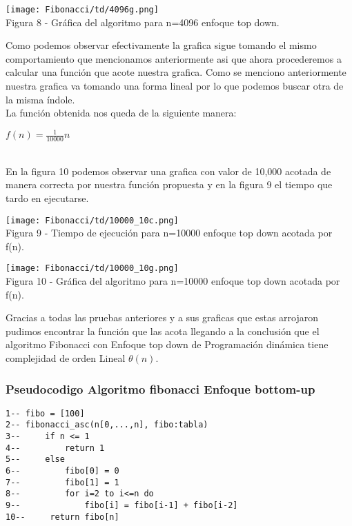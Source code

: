 \documentclass[12pt,twoside]{article}
\begin{document}
\begin{center}
    \texttt{[image: Fibonacci/td/4096g.png]}\\
    Figura 8 - Gráfica del algoritmo para n=4096 enfoque top down.
\end{center}
\newline
Como podemos observar efectivamente la grafica sigue tomando el mismo comportamiento que mencionamos anteriormente asi que ahora procederemos a calcular una función que acote nuestra grafica. Como se menciono anteriormente nuestra grafica va tomando una forma lineal por lo que podemos buscar otra de la misma índole. \\
La funci\'on obtenida nos queda de la siguiente manera:
\begin{center}
    $f(n) = \frac{1}{10000}n$
\end{center}\\
En la figura 10 podemos observar una grafica con valor de 10,000 acotada de manera correcta por nuestra función propuesta y en la figura 9 el tiempo que tardo en ejecutarse.
\begin{center}
    \texttt{[image: Fibonacci/td/10000\_10c.png]}\\
    Figura 9 - Tiempo de ejecución para n=10000 enfoque top down acotada por f(n).
\end{center}

\begin{center}
    \texttt{[image: Fibonacci/td/10000\_10g.png]}\\
    Figura 10 - Gráfica del algoritmo para n=10000 enfoque top down acotada por f(n).
\end{center}
\newline
Gracias a todas las pruebas anteriores y a sus graficas que estas arrojaron pudimos encontrar la función que las acota llegando a la conclusión que el algoritmo  Fibonacci con Enfoque top down de Programación dinámica  tiene complejidad de orden Lineal $\theta{(n)}$.

\subsubsection{Pseudocodigo Algoritmo fibonacci Enfoque bottom-up}
\begin{lstlisting}
1-- fibo = [100]
2-- fibonacci_asc(n[0,...,n], fibo:tabla)
3--     if n <= 1
4--         return 1
5--     else
6--         fibo[0] = 0
7--         fibo[1] = 1
8--         for i=2 to i<=n do
9--             fibo[i] = fibo[i-1] + fibo[i-2]
10--     return fibo[n]
\end{lstlisting}
\end{document}
